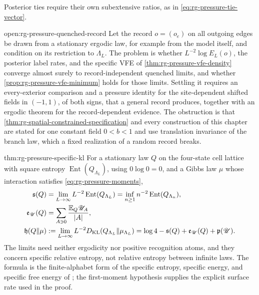 Posterior ties require their own subextensive ratios, as in
\cref{eq:rg-pressure-tie-vector}.

{open:rg-pressure-quenched-record}
Let the record $o=(o_e)$ on all outgoing edges be drawn from a stationary
ergodic law, for example from the model itself, and condition on its
restriction to $\Lambda_L$. The problem is whether $L^{-2}\log E_L(o)$, the
posterior label rates, and the specific VFE of
\cref{thm:rg-pressure-vfe-density} converge almost surely to
record-independent quenched limits, and whether
\cref{prop:rg-pressure-vfe-minimum} holds for those limits. Settling it
requires an every-exterior comparison and a pressure identity for the
site-dependent shifted fields in $(-1,1)$, of both signs, that a general
record produces, together with an ergodic theorem for the record-dependent
evidence. The obstruction is that
\cref{thm:rg-spatial-constrained-specification} and every construction of
this chapter are stated for one constant field $0<b<1$ and use translation
invariance of the branch law, which a fixed realization of a random record
breaks.

{thm:rg-pressure-specific-kl}
For a stationary law $Q$ on the four-state cell lattice with square entropy
$\operatorname{Ent}(Q_{\Lambda_L})$, using $0\log0=0$, and a Gibbs law $\mu$
whose interaction satisfies \cref{eq:rg-pressure-moments},
\begin{align}
 \mathfrak s(Q)&=\lim_{L\to\infty}L^{-2}\operatorname{Ent}(Q_{\Lambda_L})
       =\inf_{n\geq1}n^{-2}\operatorname{Ent}(Q_{\Lambda_n}),
 \label{eq:rg-pressure-entropy}\\
 \mathfrak e_{\mathscr U}(Q)&=\sum_{A\ni0}\frac{\mathbb E_Q\mathscr U_A}{|A|},
 \label{eq:rg-pressure-energy}\\
 \mathfrak h(Q\Vert\mu)&:=\lim_{L\to\infty}L^{-2}
       D_{\mathrm{KL}}(Q_{\Lambda_L}\Vert\mu_{\Lambda_L})
       =\log4-\mathfrak s(Q)+\mathfrak e_{\mathscr U}(Q)+\mathfrak p(\mathscr U).
 \label{eq:rg-pressure-specific-kl}
\end{align}
The limits need neither ergodicity nor positive recognition atoms, and they
concern specific relative entropy, not relative entropy between infinite
laws. The formula is the finite-alphabet form of the specific entropy,
specific energy, and specific free energy of
\citet[Secs.~15.2 and~15.3, Thm.~15.30]{Georgii1988}; the first-moment
hypothesis supplies the explicit surface rate used in the proof.

